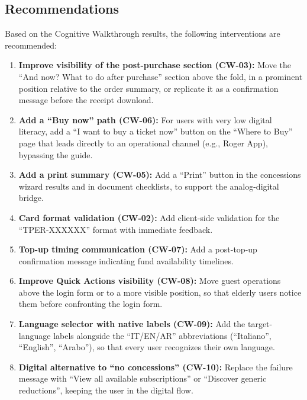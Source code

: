 \vspace{0.3cm}

\subsection{Recommendations}

\begin{tcolorbox}[colback=backgroundColor,colframe=accentGreen,arc=2mm]
\small
Based on the Cognitive Walkthrough results, the following interventions are recommended:

\begin{enumerate}[leftmargin=*]
 \item \textbf{Improve visibility of the post-purchase section (CW-03):} Move the ``And now? What to do after purchase'' section above the fold, in a prominent position relative to the order summary, or replicate it as a confirmation message before the receipt download.

 \item \textbf{Add a ``Buy now'' path (CW-06):} For users with very low digital literacy, add a ``I want to buy a ticket now'' button on the ``Where to Buy'' page that leads directly to an operational channel (e.g., Roger App), bypassing the guide.

 \item \textbf{Add a print summary (CW-05):} Add a ``Print'' button in the concessions wizard results and in document checklists, to support the analog-digital bridge.

 \item \textbf{Card format validation (CW-02):} Add client-side validation for the ``TPER-XXXXXX'' format with immediate feedback.

 \item \textbf{Top-up timing communication (CW-07):} Add a post-top-up confirmation message indicating fund availability timelines.

 \item \textbf{Improve Quick Actions visibility (CW-08):} Move guest operations above the login form or to a more visible position, so that elderly users notice them before confronting the login form.

 \item \textbf{Language selector with native labels (CW-09):} Add the target-language labels alongside the ``IT/EN/AR'' abbreviations (``Italiano'', ``English'', ``Arabo''), so that every user recognizes their own language.

 \item \textbf{Digital alternative to ``no concessions'' (CW-10):} Replace the failure message with ``View all available subscriptions'' or ``Discover generic reductions'', keeping the user in the digital flow.


\end{enumerate}
\end{tcolorbox}
